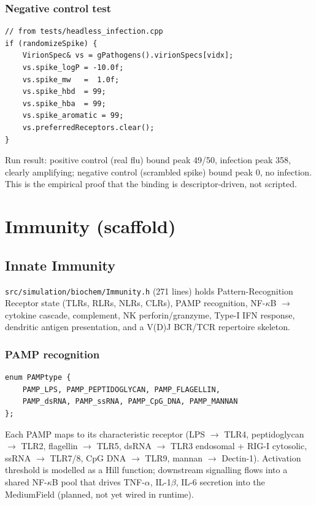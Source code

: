 \documentclass[11pt,letterpaper,twoside,openany]{book}
\newcommand{\file}[1]{\texttt{\small#1}}
\begin{document}
\section{Negative control test}

\begin{lstlisting}
// from tests/headless_infection.cpp
if (randomizeSpike) {
    VirionSpec& vs = gPathogens().virionSpecs[vidx];
    vs.spike_logP = -10.0f;
    vs.spike_mw   =  1.0f;
    vs.spike_hbd  = 99;
    vs.spike_hba  = 99;
    vs.spike_aromatic = 99;
    vs.preferredReceptors.clear();
}
\end{lstlisting}
Run result: positive control (real flu) bound peak 49/50, infection
peak 358, clearly amplifying; negative control (scrambled spike)
bound peak 0, no infection. This is the empirical proof that the
binding is descriptor-driven, not scripted.

\part{Immunity (scaffold)}

\chapter{Innate Immunity}
\label{ch:innate}

\file{src/simulation/biochem/Immunity.h} (271 lines) holds
Pattern-Recognition Receptor state (TLRs, RLRs, NLRs, CLRs), PAMP
recognition, NF-$\kappa$B $\to$ cytokine cascade, complement, NK
perforin/granzyme, Type-I IFN response, dendritic antigen
presentation, and a V(D)J BCR/TCR repertoire skeleton.

\section{PAMP recognition}

\begin{lstlisting}
enum PAMPtype {
    PAMP_LPS, PAMP_PEPTIDOGLYCAN, PAMP_FLAGELLIN,
    PAMP_dsRNA, PAMP_ssRNA, PAMP_CpG_DNA, PAMP_MANNAN
};
\end{lstlisting}
Each PAMP maps to its characteristic receptor (LPS $\to$ TLR4,
peptidoglycan $\to$ TLR2, flagellin $\to$ TLR5, dsRNA $\to$ TLR3
endosomal + RIG-I cytosolic, ssRNA $\to$ TLR7/8, CpG DNA $\to$ TLR9,
mannan $\to$ Dectin-1). Activation threshold is modelled as a Hill
function; downstream signalling flows into a shared NF-$\kappa$B
pool that drives TNF-$\alpha$, IL-1$\beta$, IL-6 secretion into the
MediumField (planned, not yet wired in runtime).
\end{document}

